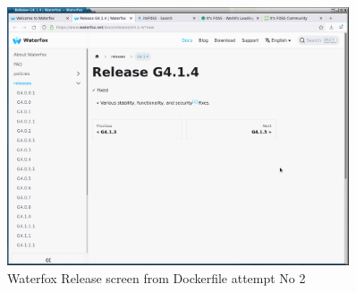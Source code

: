 %

\begin{figure}[!h]
  \centering
   \includegraphics[width=0.9\textwidth]{releas.png}
  \caption{Waterfox Release screen from Dockerfile attempt No 2}
  \label{fig:releas}
\end{figure}

%

